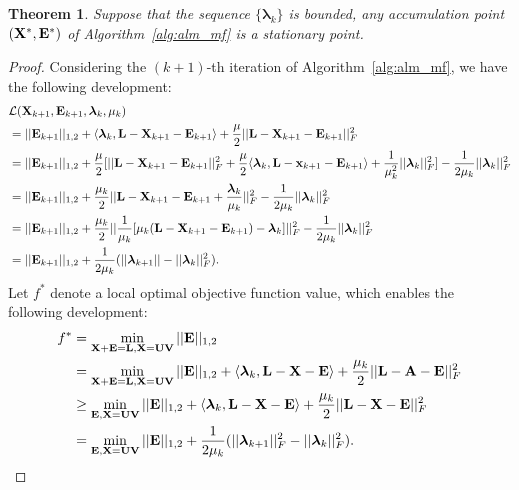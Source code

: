 \documentclass[letterpaper]{article}
\newtheorem{theorem}{Theorem}
\def\bE{{\bf E}}
\def\blambda{{\bm \lambda}}
\def\calL{{\mathcal{L}}}
\def\bL{{\bf L}}
\def\bU{{\bf U}}
\def\bV{{\bf V}}
\def\bX{{\bf X}}
\def\bx{{\bf x}}
\def\bA{{\bf A}}
\def\bx{{\bf x}}
\def\bX{{\bf X}}
\begin{document}
\begin{theorem}\label{theorem:alm_convergence}
  Suppose that the sequence $\{ \blambda_{k} \}$ is bounded, any accumulation point $(\bX^*, \bE^*)$ of Algorithm~\ref{alg:alm_mf} is a stationary point.
\end{theorem}

\begin{proof}
    Considering the $(k+1)$-th iteration of Algorithm~\ref{alg:alm_mf}, we have the following development:
    \begin{align}\label{eq:proof1}
      & \calL(\bX_{k+1}, \bE_{k+1}, \blambda_{k}, \mu_{k})   \nonumber \\ 
      & = || \bE_{k+1} ||_{1,2} + \langle \blambda_{k}, \bL - \bX_{k+1} - \bE_{k+1} \rangle + \frac{\mu}{2} || \bL - \bX_{k+1} - \bE_{k+1} ||_{F}^2         \nonumber \\
      & = || \bE_{k+1} ||_{1,2} + \frac{\mu}{2} [ || \bL - \bX_{k+1} - \bE_{k+1} ||_{F}^2 + \frac{\mu}{2} \langle \blambda_{k}, \bL - \bx_{k+1} - \bE_{k+1} \rangle + \frac{1}{\mu_{k}^2} || \blambda_k ||_F^2 ] - \frac{1}{2\mu_k} || \blambda_k ||_F^2    \nonumber  \\
      & = || \bE_{k+1} ||_{1,2} + \frac{\mu_k}{2} || \bL - \bX_{k+1} - \bE_{k+1} + \frac{\blambda_k}{\mu_k} ||_F^2 - \frac{1}{2\mu_k} || \blambda_k ||_F^2   \nonumber \\
      & = || \bE_{k+1} ||_{1,2} + \frac{\mu_k}{2} || \frac{1}{\mu_k} [ \mu_k (\bL - \bX_{k+1} - \bE_{k+1}) - \blambda_k ] ||_F^2 - \frac{1}{2\mu_k} || \blambda_k ||_F^2   \nonumber \\
      & = || \bE_{k+1} ||_{1,2} + \frac{1}{2\mu_k} ( || \blambda_{k+1} || - || \blambda_{k} ||_F^2 )   .
    \end{align}
    \noindent
    Let $f^*$ denote a local optimal objective function value, which enables the following development:
    \begin{align}\label{eq:proof2}
      f^* & = \min_{\bX + \bE = \bL, \bX = \bU \bV} || \bE ||_{1,2}   \nonumber  \\
          & = \min_{\bX + \bE = \bL, \bX = \bU \bV} || \bE ||_{1,2} + \langle \blambda_k, \bL - \bX - \bE \rangle + \frac{\mu_k}{2} || \bL - \bA - \bE ||_F^2   \nonumber \\
          & \geq \min_{\bE, \bX = \bU \bV} || \bE ||_{1,2} + \langle \blambda_k, \bL - \bX - \bE \rangle + \frac{\mu_k}{2} ||  \bL - 
          \bX - \bE ||_F^2     \nonumber \\
          & = \min_{\bE, \bX = \bU \bV} || \bE ||_{1,2} + \frac{1}{2\mu_k} (|| \blambda_{k+1} ||_F^2 - || \blambda_{k} ||_F^2)   .

\end{align}
\end{proof}
\end{document}
